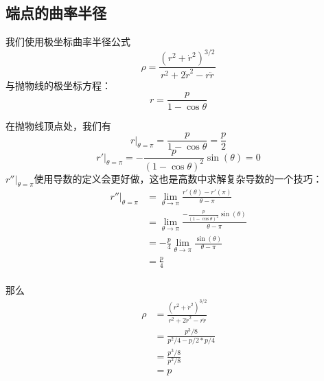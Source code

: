 \subsection{端点的曲率半径}

我们使用极坐标曲率半径公式
$$
\rho = \frac{(r^2 + \dot r^2)^{3/2}}{r^2 + 2\dot r^2 - r\ddot r}
$$
与抛物线的极坐标方程：
$$
r = \frac{p}{1 - \cos \theta }
$$

在抛物线顶点处，我们有
$$
r|_{\theta = \pi} = \frac{p}{1 - \cos \theta} = \frac{p}{2}
$$
$$
r' |_{\theta = \pi} = -\frac{p}{(1 - \cos \theta)^2} \sin(\theta) = 0
$$
$r'' |_{\theta = \pi}$使用导数的定义会更好做，这也是高数中求解复杂导数的一个技巧：
$$
\begin{aligned}
r''|_{\theta = \pi}  &= \lim_{\theta \to \pi} \frac{r'(\theta) - r'(\pi)}{\theta - \pi}\\
&=\lim_{\theta \to \pi} \frac{-\frac{p}{(1 - \cos \theta)^2} \sin(\theta)}{\theta - \pi}\\
&=-\frac{p}{4} \lim_{\theta \to \pi} \frac{\sin(\theta)}{\theta - \pi}\\
&=\frac{p}{4}\\
\end{aligned}
$$

那么
$$
\begin{aligned}
\rho &= \frac{(r^2 + \dot r^2)^{3/2}}{r^2 + 2\dot r^2 - r\ddot r}\\
&=\frac{p^3/8}{p^2/4 - p/2*p/4}\\
&=\frac{p^3/8}{p^2/8}\\
&=p\\
\end{aligned}
$$